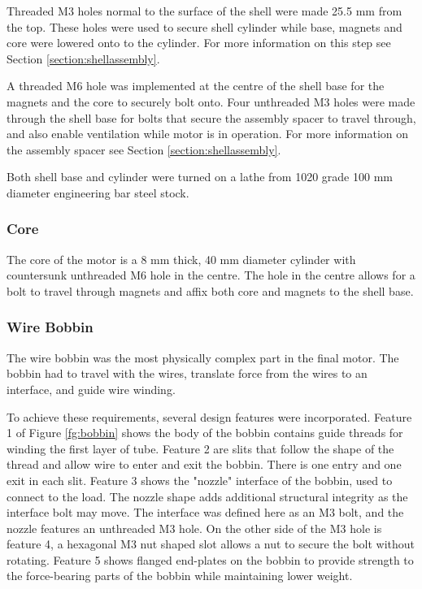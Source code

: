 \documentclass[a4paper,12pt]{article}
\begin{document}
Threaded M3 holes normal to the surface of the shell were made 25.5 mm from the top. These holes were used to secure shell cylinder while base, magnets and core were lowered onto to the cylinder. For more information on this step see Section \ref{section:shellassembly}.

A threaded M6 hole was implemented at the centre of the shell base for the magnets and the core to securely bolt onto. Four unthreaded M3 holes were made through the shell base for bolts that secure the assembly spacer to travel through, and also enable ventilation while motor is in operation. For more information on the assembly spacer see Section \ref{section:shellassembly}.

Both shell base and cylinder were turned on a lathe from 1020 grade 100 mm diameter engineering bar steel stock.

\subsubsection{Core}

The core of the motor is a 8 mm thick, 40 mm diameter cylinder with countersunk unthreaded M6 hole in the centre. The hole in the centre allows for a bolt to travel through magnets and affix both core and magnets to the shell base.

\subsubsection{Wire Bobbin}

The wire bobbin was the most physically complex part in the final motor. The bobbin had to travel with the wires, translate force from the wires to an interface, and guide wire winding.

To achieve these requirements, several design features were incorporated. Feature 1 of Figure \ref{fg:bobbin} shows the body of the bobbin contains guide threads for winding the first layer of tube. Feature 2 are slits that follow the shape of the thread and allow wire to enter and exit the bobbin. There is one entry and one exit in each slit. Feature 3 shows the "nozzle" interface of the bobbin, used to connect to the load. The nozzle shape adds additional structural integrity as the interface bolt may move. The interface was defined here as an M3 bolt, and the nozzle features an unthreaded M3 hole. On the other side of the M3 hole is feature 4, a hexagonal M3 nut shaped slot allows a nut to secure the bolt without rotating. Feature 5 shows flanged end-plates on the bobbin to provide strength to the force-bearing parts of the bobbin while maintaining lower weight.
\end{document}
